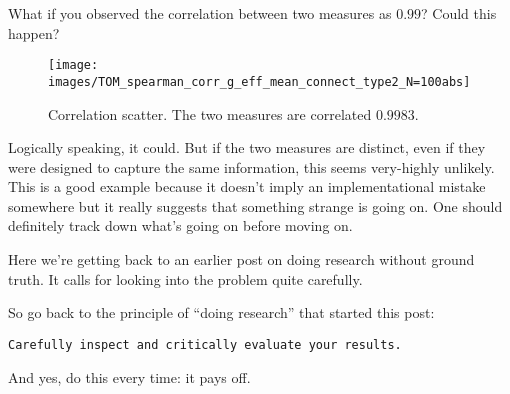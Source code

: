\documentclass[]{article}
\begin{document}
What if you observed the correlation between two measures as \(0.99\)?
Could this happen?

\begin{figure}
\texttt{[image: images/TOM\_spearman\_corr\_g\_eff\_mean\_connect\_type2\_N=100abs]} \caption{Correlation scatter. The two measures are correlated $0.9983$.}\label{fig:unnamed-chunk-2}
\end{figure}

Logically speaking, it could. But if the two measures are distinct, even
if they were designed to capture the same information, this seems
very-highly unlikely. This is a good example because it doesn't imply an
implementational mistake somewhere but it really suggests that something
strange is going on. One should definitely track down what's going on
before moving on.

Here we're getting back to an earlier post on doing research without
ground truth. It calls for looking into the problem quite carefully.

So go back to the principle of ``doing research'' that started this
post:

\texttt{Carefully\ inspect\ and\ critically\ evaluate\ your\ results.}

And yes, do this every time: it pays off.
\end{document}

